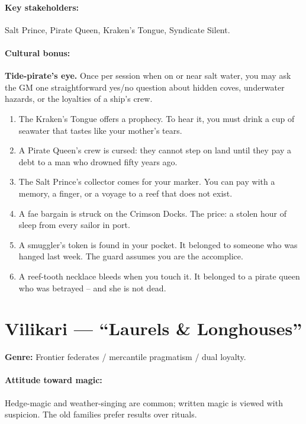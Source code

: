 \paragraph{Key stakeholders:} Salt Prince, Pirate Queen, Kraken's Tongue, Syndicate Silent.

\paragraph{Cultural bonus:} \textbf{Tide-pirate's eye.} Once per session when on or near salt water, you may ask the GM one straightforward yes/no question about hidden coves, underwater hazards, or the loyalties of a ship's crew.

\begin{tcolorbox}[colback=gray!5!white, colframe=gray!70!black, title=Zakov Mini-Generator (d6),breakable]
\begin{enumerate}
\item The Kraken's Tongue offers a prophecy. To hear it, you must drink a cup of seawater that tastes like your mother's tears.
\item A Pirate Queen's crew is cursed: they cannot step on land until they pay a debt to a man who drowned fifty years ago.
\item The Salt Prince's collector comes for your marker. You can pay with a memory, a finger, or a voyage to a reef that does not exist.
\item A fae bargain is struck on the Crimson Docks. The price: a stolen hour of sleep from every sailor in port.
\item A smuggler's token is found in your pocket. It belonged to someone who was hanged last week. The guard assumes you are the accomplice.
\item A reef-tooth necklace bleeds when you touch it. It belonged to a pirate queen who was betrayed -- and she is not dead.
\end{enumerate}
\end{tcolorbox}

\clearpage
\section{Vilikari --- ``Laurels \& Longhouses''}
\textbf{Genre:} Frontier federates / mercantile pragmatism / dual loyalty.

\paragraph{Attitude toward magic:} Hedge-magic and weather-singing are common; written magic is viewed with suspicion. The old families prefer results over rituals.


